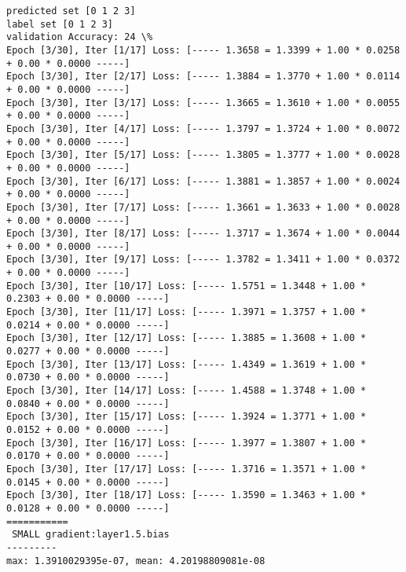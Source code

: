 \documentclass[11pt]{article}
\begin{document}
    \begin{Verbatim}[commandchars=\\\{\}]
predicted set [0 1 2 3]
label set [0 1 2 3]
validation Accuracy: 24 \%
Epoch [3/30], Iter [1/17] Loss: [----- 1.3658 = 1.3399 + 1.00 * 0.0258 + 0.00 * 0.0000 -----]
Epoch [3/30], Iter [2/17] Loss: [----- 1.3884 = 1.3770 + 1.00 * 0.0114 + 0.00 * 0.0000 -----]
Epoch [3/30], Iter [3/17] Loss: [----- 1.3665 = 1.3610 + 1.00 * 0.0055 + 0.00 * 0.0000 -----]
Epoch [3/30], Iter [4/17] Loss: [----- 1.3797 = 1.3724 + 1.00 * 0.0072 + 0.00 * 0.0000 -----]
Epoch [3/30], Iter [5/17] Loss: [----- 1.3805 = 1.3777 + 1.00 * 0.0028 + 0.00 * 0.0000 -----]
Epoch [3/30], Iter [6/17] Loss: [----- 1.3881 = 1.3857 + 1.00 * 0.0024 + 0.00 * 0.0000 -----]
Epoch [3/30], Iter [7/17] Loss: [----- 1.3661 = 1.3633 + 1.00 * 0.0028 + 0.00 * 0.0000 -----]
Epoch [3/30], Iter [8/17] Loss: [----- 1.3717 = 1.3674 + 1.00 * 0.0044 + 0.00 * 0.0000 -----]
Epoch [3/30], Iter [9/17] Loss: [----- 1.3782 = 1.3411 + 1.00 * 0.0372 + 0.00 * 0.0000 -----]
Epoch [3/30], Iter [10/17] Loss: [----- 1.5751 = 1.3448 + 1.00 * 0.2303 + 0.00 * 0.0000 -----]
Epoch [3/30], Iter [11/17] Loss: [----- 1.3971 = 1.3757 + 1.00 * 0.0214 + 0.00 * 0.0000 -----]
Epoch [3/30], Iter [12/17] Loss: [----- 1.3885 = 1.3608 + 1.00 * 0.0277 + 0.00 * 0.0000 -----]
Epoch [3/30], Iter [13/17] Loss: [----- 1.4349 = 1.3619 + 1.00 * 0.0730 + 0.00 * 0.0000 -----]
Epoch [3/30], Iter [14/17] Loss: [----- 1.4588 = 1.3748 + 1.00 * 0.0840 + 0.00 * 0.0000 -----]
Epoch [3/30], Iter [15/17] Loss: [----- 1.3924 = 1.3771 + 1.00 * 0.0152 + 0.00 * 0.0000 -----]
Epoch [3/30], Iter [16/17] Loss: [----- 1.3977 = 1.3807 + 1.00 * 0.0170 + 0.00 * 0.0000 -----]
Epoch [3/30], Iter [17/17] Loss: [----- 1.3716 = 1.3571 + 1.00 * 0.0145 + 0.00 * 0.0000 -----]
Epoch [3/30], Iter [18/17] Loss: [----- 1.3590 = 1.3463 + 1.00 * 0.0128 + 0.00 * 0.0000 -----]
===========
 SMALL gradient:layer1.5.bias
---------
max: 1.3910029395e-07, mean: 4.20198809081e-08

    \end{Verbatim}

    \begin{center}
    \end{center}
    { \hspace*{\fill} \\}
    
    \begin{center}
    \end{center}
    { \hspace*{\fill} \\}
    
\end{document}
